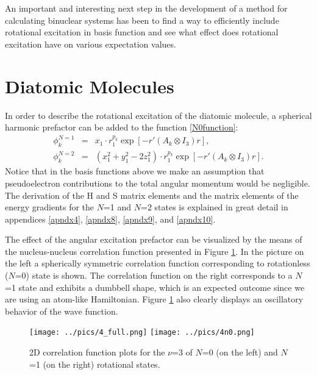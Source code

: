 An important and interesting next step 
in the development of a method for calculating
binuclear systems 
has been to find a way to efficiently include rotational excitation
in basis function and see what effect does rotational excitation have on
various expectation values. 

\section{Diatomic Molecules}

In order to describe the rotational excitation of the diatomic molecule,
a spherical harmonic prefactor can be added to the function \ref{N0function}:
\begin{eqnarray}
\phi_k^{N=1} &=& x_1 \cdot r_1^{p_k} \exp [-r'(A_k \otimes I_3) r], \\
\label{N1function}
\phi_k^{N=2} &=& (x_1^2 + y_1^2 - 2z_1^2) \cdot r_1^{p_k} \exp [-r'(A_k \otimes I_3) r].
\label{N2function}
\end{eqnarray}
Notice that in the basis functions above we make an assumption that 
pseudoelectron contributions to the total angular momentum would be 
negligible. The derivation of the H and S matrix elements and 
the matrix elements of the energy gradients 
for the $N$=1 and $N$=2 states is explained in great detail in appendices 
\ref{apndx4}, \ref{apndx8}, \ref{apndx9}, and \ref{apndx10}.

The effect of the angular excitation prefactor can be visualized
by the means of the nucleus-nucleus correlation function presented 
in Figure \ref{1d}. In the picture on the left a spherically
symmetric correlation function corresponding to rotationless ($N$=0)
state is shown. The correlation function on the right corresponds to 
a $N$=1 state and exhibits a dumbbell shape, which is an expected outcome
since we are using an atom-like Hamiltonian. Figure \ref{1d} also 
clearly displays an oscillatory behavior of the wave function. 

\begin{figure}[t]
\begin{center}
\texttt{[image: ../pics/4\_full.png]}
\texttt{[image: ../pics/4n0.png]}
\end{center}
\caption{\label{1d}  2D correlation function plots for the 
$\nu$=3 of $N$=0 (on the left) and $N$=1 (on the right) rotational states.}
\end{figure}

